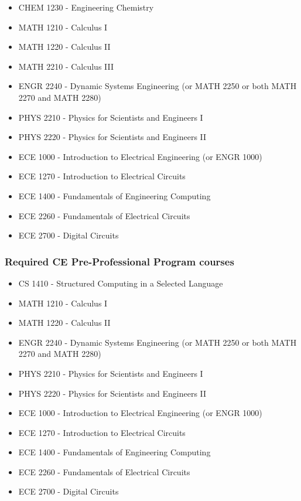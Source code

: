 \begin{itemize}
    \item CHEM 1230 - Engineering Chemistry
    \item MATH 1210 - Calculus I
    \item MATH 1220 - Calculus II
    \item MATH 2210 - Calculus III
    \item ENGR 2240 - Dynamic Systems Engineering (or MATH 2250 or both MATH 2270 and MATH 2280)
    \item PHYS 2210 - Physics for Scientists and Engineers I
    \item PHYS 2220 - Physics for Scientists and Engineers II
    \item ECE 1000 - Introduction to Electrical Engineering (or ENGR 1000)
    \item ECE 1270 - Introduction to Electrical Circuits
    \item ECE 1400 - Fundamentals of Engineering Computing
    \item ECE 2260 - Fundamentals of Electrical Circuits
    \item ECE 2700 - Digital Circuits
\end{itemize}


\subsubsection{Required CE Pre-Professional Program courses}
\label{sec:required-ce-pre}

\begin{itemize}
    \item CS 1410 - Structured Computing in a Selected Language
    \item MATH 1210 - Calculus I
    \item MATH 1220 - Calculus II
    \item ENGR 2240 - Dynamic Systems Engineering (or MATH 2250 or both MATH 2270 and MATH 2280)
    \item PHYS 2210 - Physics for Scientists and Engineers I
    \item PHYS 2220 - Physics for Scientists and Engineers II
    \item ECE 1000 - Introduction to Electrical Engineering (or ENGR 1000)
    \item ECE 1270 - Introduction to Electrical Circuits
    \item ECE 1400 - Fundamentals of Engineering Computing
    \item ECE 2260 - Fundamentals of Electrical Circuits
    \item ECE 2700 - Digital Circuits
\end{itemize}

